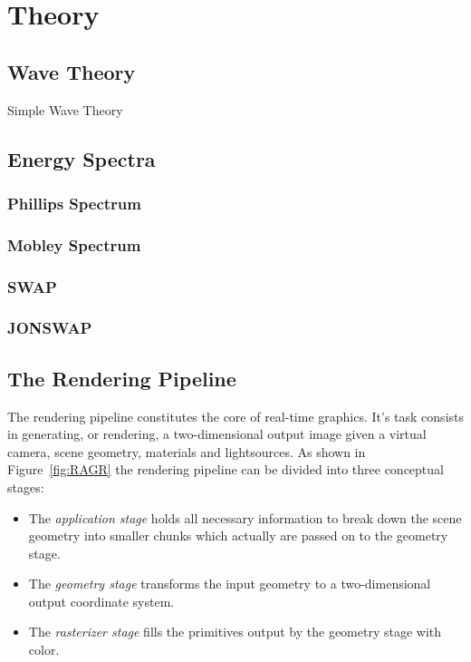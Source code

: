 \chapter{Theory}
\label{Theory}

\section{Wave Theory}

Simple Wave Theory

\section{Energy Spectra}

\subsection{Phillips Spectrum}
\subsection{Mobley Spectrum}
\subsection{SWAP}
\subsection{JONSWAP}

%
%
%
%

\section{The Rendering Pipeline}
\label{RenderingPipelineS}
The rendering pipeline constitutes the core of real-time graphics. It's task
consists in generating, or rendering, a two-dimensional output image given a
virtual camera, scene geometry, materials and
lightsources\cite{book:akenine-rtr}. As shown in Figure~\ref{fig:RAGR} the
rendering pipeline can be divided into three conceptual stages:
\begin{itemize}
 \item The \textit{application stage} holds all necessary information to break
down the scene geometry into smaller chunks which actually are passed on to the
geometry stage.
 \item The \textit{geometry stage} transforms the input geometry to a
two-dimensional output coordinate system.
 \item The \textit{rasterizer stage} fills the primitives output by the
geometry stage with color.
\end{itemize}

